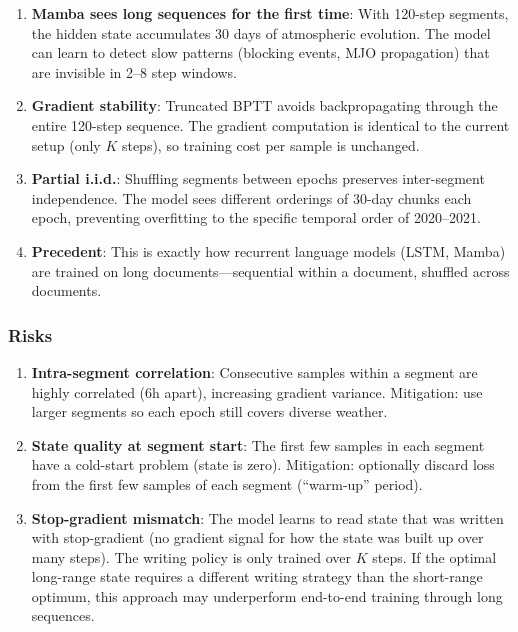 \documentclass[11pt,a4paper]{article}
\begin{document}
\begin{enumerate}
  \item \textbf{Mamba sees long sequences for the first time}: With 120-step segments, the hidden state accumulates 30 days of atmospheric evolution. The model can learn to detect slow patterns (blocking events, MJO propagation) that are invisible in 2--8 step windows.

  \item \textbf{Gradient stability}: Truncated BPTT avoids backpropagating through the entire 120-step sequence. The gradient computation is identical to the current setup (only $K$ steps), so training cost per sample is unchanged.

  \item \textbf{Partial i.i.d.}: Shuffling segments between epochs preserves inter-segment independence. The model sees different orderings of 30-day chunks each epoch, preventing overfitting to the specific temporal order of 2020--2021.

  \item \textbf{Precedent}: This is exactly how recurrent language models (LSTM, Mamba) are trained on long documents---sequential within a document, shuffled across documents.
\end{enumerate}

\subsubsection{Risks}

\begin{enumerate}
  \item \textbf{Intra-segment correlation}: Consecutive samples within a segment are highly correlated (6h apart), increasing gradient variance. Mitigation: use larger segments so each epoch still covers diverse weather.

  \item \textbf{State quality at segment start}: The first few samples in each segment have a cold-start problem (state is zero). Mitigation: optionally discard loss from the first few samples of each segment (``warm-up'' period).

  \item \textbf{Stop-gradient mismatch}: The model learns to read state that was written with stop-gradient (no gradient signal for how the state was built up over many steps). The writing policy is only trained over $K$ steps. If the optimal long-range state requires a different writing strategy than the short-range optimum, this approach may underperform end-to-end training through long sequences.
\end{enumerate}
\end{document}

